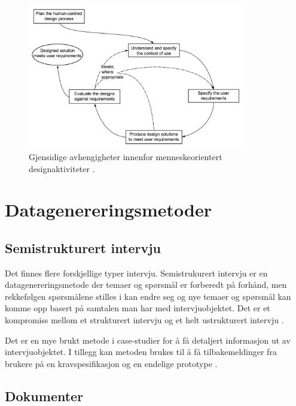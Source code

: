 \begin{figure}
\centering
\includegraphics[width=0.85\textwidth]{fig/iso9241-210}
\caption{Gjensidige avhengigheter innenfor menneskeorientert designaktiviteter \citep{dis20099241}.}
\label{fig:iso9241-210}
\end{figure}

\section{Datagenereringsmetoder}

\subsection{Semistrukturert intervju}
Det finnes flere forskjellige typer intervju. Semistrukurert intervju er en datagenereringsmetode
der temaer og spørsmål er forberedt på forhånd, men rekkefølgen spørsmålene stilles i kan endre seg
og nye temaer og spørsmål kan komme opp basert på samtalen man har med intervjuobjektet. Det er et
kompromiss mellom et strukturert intervju og et helt ustrukturert intervju \citep[s. 188]{oates}.

Det er en mye brukt metode i case-studier for å få detaljert informasjon ut av intervjuobjektet.
I tillegg kan metoden brukes til å få tilbakemeldinger fra brukere på en kravspesifikasjon og en
endelige prototype \citep[s. 187]{oates}.

\subsection{Dokumenter}

